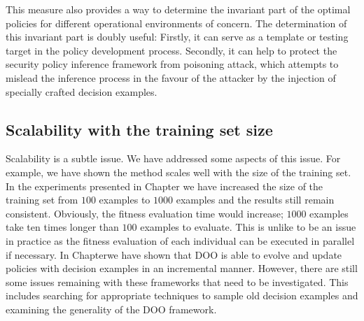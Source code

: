 This measure also provides a way to determine the invariant part of
the optimal policies for different operational environments of
concern. The determination of this invariant part is doubly useful:
Firstly, it can serve as a template or testing target in the policy
development process. Secondly, it can help to protect the security
policy inference framework from poisoning attack, which attempts to
mislead the inference process in the favour of the attacker by the
injection of specially crafted decision examples.

\subsection{Scalability with the training set size}
Scalability is a subtle issue. We have addressed some aspects of this
issue. For example, we have shown the method scales well with the size
of the training set. In the experiments presented in
Chapter  we have increased the
size of the training set from $100$ examples to $1000$ examples and
the results still remain consistent. Obviously, the fitness evaluation
time would increase; $1000$ examples take ten times longer than $100$
examples to evaluate. This is unlike to be an issue in practice as the
fitness evaluation of each individual can be executed in parallel if
necessary. In Chapterwe have
shown that DOO is able to evolve and update policies with decision
examples in an incremental manner. However, there are still some
issues remaining with these frameworks that need to be
investigated. This includes searching for appropriate techniques to
sample old decision examples and examining the generality of the DOO
framework.

